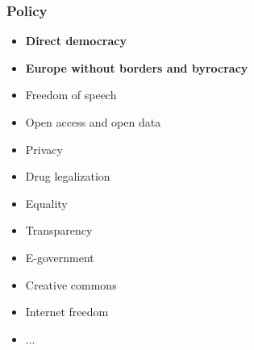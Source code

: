 \begin{frame}
	\frametitle{Policy}
	\begin{itemize}
		\item \textbf{Direct democracy}
		\item \textbf{Europe without borders and byrocracy}
		\item Freedom of speech
		\item Open access and open data
		\item Privacy
		\item Drug legalization
		\item Equality
		\item Transparency
		\item E-government
		\item Creative commons
		\item Internet freedom
		\item ...
	\end{itemize}
	
\end{frame}
